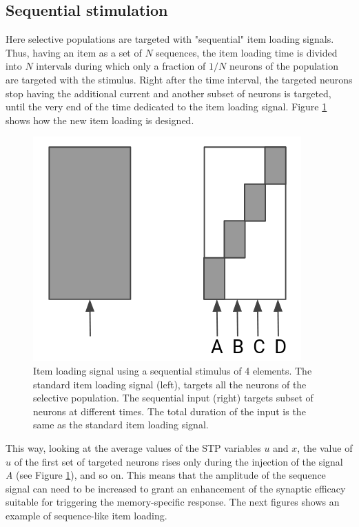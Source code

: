 \documentclass[a4paper, 12pt, twoside, openright]{book}
\begin{document}
\subsection{Sequential stimulation}
Here selective populations are targeted with "sequential" item loading signals. Thus, having an item as a set of $N$ sequences, the item loading time is divided into $N$ intervals during which only a fraction of $1/N$ neurons of the population are targeted with the stimulus. Right after the time interval, the targeted neurons stop having the additional current and another subset of neurons is targeted, until the very end of the time dedicated to the item loading signal. Figure \ref{fig:sequence_item} shows how the new item loading is designed.

\begin{figure}[H]
\centering
\includegraphics[scale=0.3]{figures/sequence.png}
\caption{Item loading signal using a sequential stimulus of 4 elements. The standard item loading signal (left), targets all the neurons of the selective population. The sequential input (right) targets subset of neurons at different times. The total duration of the input is the same as the standard item loading signal.}
\label{fig:sequence_item}
\end{figure}

This way, looking at the average values of the STP variables $u$ and $x$, the value of $u$ of the first set of targeted neurons rises only during the injection of the signal \textit{A} (see Figure \ref{fig:sequence_item}), and so on. This means that the amplitude of the sequence signal can need to be increased to grant an enhancement of the synaptic efficacy suitable for triggering the memory-specific response. The next figures shows an example of sequence-like item loading.
\end{document}
